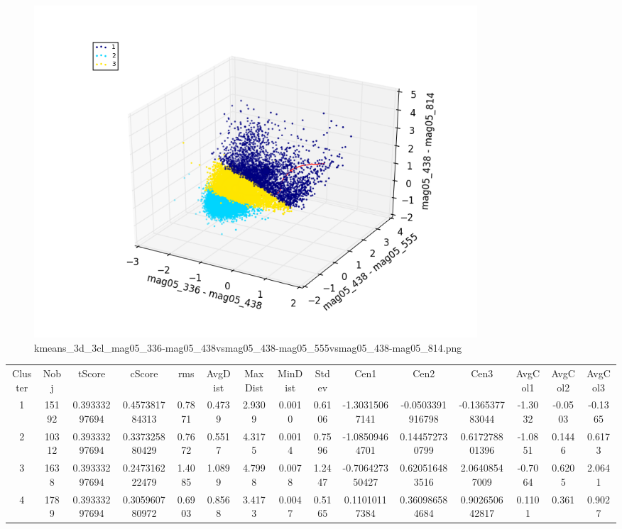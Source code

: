 \documentclass{article}%
\begin{document}
\begin{figure}%
\centering%
\includegraphics[width=0.8\textwidth]{kmeans_3d_3cl_mag05_336-mag05_438vsmag05_438-mag05_555vsmag05_438-mag05_814.png}%
\caption{kmeans\_3d\_3cl\_mag05\_336{-}mag05\_438vsmag05\_438{-}mag05\_555vsmag05\_438{-}mag05\_814.png}%
\end{figure}

%
\newpage

%
\begin{table}
\begin{tabular}{ccccccccccccccc}
Cluster & Nobj & tScore & cScore & rms & AvgDist & MaxDist & MinDist & Stdev & Cen1 & Cen2 & Cen3 & AvgCol1 & AvgCol2 & AvgCol3 \\
1 & 15192 & 0.39333297694 & 0.457381784313 & 0.7871 & 0.4739 & 2.9309 & 0.0010 & 0.6106 & -1.30315067141 & -0.0503391916798 & -0.136537783044 & -1.3032 & -0.0503 & -0.1365 \\
2 & 10312 & 0.39333297694 & 0.337325880429 & 0.7672 & 0.5517 & 4.3175 & 0.0014 & 0.7596 & -1.08509464701 & 0.144572730799 & 0.617278801396 & -1.0851 & 0.1446 & 0.6173 \\
3 & 1638 & 0.39333297694 & 0.247316222479 & 1.4085 & 1.0899 & 4.7998 & 0.0078 & 1.2447 & -0.706427350427 & 0.620516483516 & 2.06408547009 & -0.7064 & 0.6205 & 2.0641 \\
4 & 1789 & 0.39333297694 & 0.305960780972 & 0.6903 & 0.8568 & 3.4173 & 0.0047 & 0.5165 & 0.11010117384 & 0.360986584684 & 0.902650642817 & 0.1101 & 0.361 & 0.9027 \\
\end{tabular}
\end{table}
%
\end{document}
